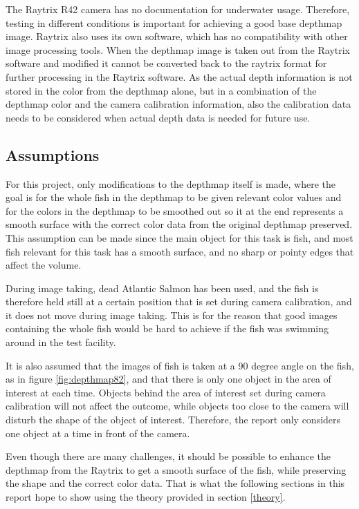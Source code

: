 The Raytrix R42 camera has no documentation for underwater usage. Therefore, testing in different conditions is important for achieving a good base depthmap image. Raytrix also uses its own software, which has no compatibility with other image processing tools. When the depthmap image is taken out from the Raytrix software and modified it cannot be converted back to the raytrix format for further processing in the Raytrix software. As the actual depth information is not stored in the color from the depthmap alone, but in a combination of the depthmap color and the camera calibration information, also the calibration data needs to be considered when actual depth data is needed for future use. 



\subsection{Assumptions}

For this project, only modifications to the depthmap itself is made, where the goal is for the whole fish in the depthmap to be given relevant color values and for the colors in the depthmap to be smoothed out so it at the end represents a smooth surface with the correct color data from the original depthmap preserved. This assumption can be made since the main object for this task is fish, and most fish relevant for this task has a smooth surface, and no sharp or pointy edges that affect the volume. 

During image taking, dead Atlantic Salmon has been used, and the fish is therefore held still at a certain position that is set during camera calibration, and it does not move during image taking. This is for the reason that good images containing the whole fish would be hard to achieve if the fish was swimming around in the test facility.

It is also assumed that the images of fish is taken at a 90 degree angle on the fish, as in figure \ref{fig:depthmap82}, and that there is only one object in the area of interest at each time. Objects behind the area of interest set during camera calibration will not affect the outcome, while objects too close to the camera will disturb the shape of the object of interest. Therefore, the report only considers one object at a time in front of the camera.

Even though there are many challenges, it should be possible to enhance the depthmap from the Raytrix to get a smooth surface of the fish, while preserving the shape and the correct color data. That is what the following sections in this report hope to show using the theory provided in section \ref{theory}.